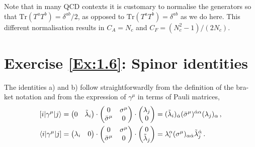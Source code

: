 \begin{enumerate}[a)]
Note that in many QCD contexts it is customary to normalise the generators so that $\mathrm{Tr}(T^a T^b) = \delta^{ab}/2$, as opposed to $\mathrm{Tr}(T^a T^b) = \delta^{ab}$ as we do here. This different normalisation results in $C_A = N_c$ and $C_F = (N_c^2-1)/(2 N_c)$.

\end{enumerate}


\section*{Exercise \ref{Ex:1.6}: Spinor identities}
\label{Sol:1.6}

The identities a) and b) follow straightforwardly from the definition of the bra-ket notation and from the expression of $\gamma^{\mu}$ in terms of Pauli matrices,
\begin{align}
[ i | \gamma^{\mu} | j \rangle & = \begin{pmatrix} 0 & \tilde{\lambda}_i \\ \end{pmatrix} \cdot \begin{pmatrix} 0 & \sigma^{\mu} \\ \bar{\sigma}^{\mu} & 0 \\ \end{pmatrix} \cdot
  \begin{pmatrix} \lambda_j \\ 0 \\ \end{pmatrix} = (\tilde{\lambda}_i)_{\dot\alpha} (\bar{\sigma}^{\mu})^{\dot{\alpha} \alpha} (\lambda_j)_{\alpha} \,, \\
\langle i | \gamma^{\mu} | j ] & = \begin{pmatrix} \lambda_i & 0 \\ \end{pmatrix} \cdot \begin{pmatrix} 0 & \sigma^{\mu} \\ \bar{\sigma}^{\mu} & 0 \\ \end{pmatrix} \cdot
  \begin{pmatrix} 0 \\ \tilde{\lambda}_j \\ \end{pmatrix} = \lambda_i^{\alpha} (\sigma^{\mu})_{\alpha\dot{\alpha}} \tilde{\lambda}_j^{\dot\alpha}\,.
\end{align}
